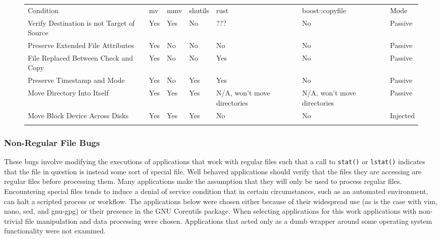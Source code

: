         \begin{figure*}[t]
                \scriptsize{}
                \begin{tabular}{l l l l l l | l}
                \toprule{}
                  Condition & mv & mmv & shutils & rust & boost::copyfile & Mode\\
                  Verify Destination is not Target of Source & Yes & Yes & No & ??? & No & Passive\\
                  Preserve Extended File Attributes & Yes & No & No & No & No & Passive\\
                  File Replaced Between Check and Copy & Yes & No & No & Yes & No & Passive\\
                  Preserve Timestamp and Mode & Yes & No & Yes & Yes & No & Passive\\
                  Move Directory Into Itself & Yes & Yes & Yes & N/A, won't move directories & N/A, won't move directories & Passive\\
                  Move Block Device Across Disks & Yes & Yes & Yes & No & No & Injected\\
                \bottomrule{}
                \end{tabular}
        \end{figure*}

        \subsubsection{Non-Regular File Bugs}

        These bugs involve modifying the executions of applications that work with regular files such that a call to
        {\tt stat()} or {\tt lstat()} indicates that the file in question is instead some sort of special file.  Well
        behaved applications should verify that the files they are accessing are regular files before processing them.
        Many applications make the assumption that they will only be used to process regular files.  Encountering
        special files tends to induce a denial of service condition that in certain circumstances, such as an automated
        environment, can halt a scripted process or workflow.  The applications below were chosen either because of
        their widespread use (as is the case with vim, nano, sed, and gnu-gpg) or their presence in the GNU Coreutils
        package.  When selecting applications for this work applications with non-trivial file manipulation and data
        processing were chosen.  Applications that acted only as a dumb wrapper around some operating system
        functionality were not examined.

